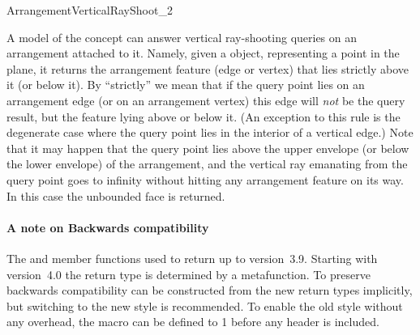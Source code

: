 
\ccRefPageBegin

\begin{ccRefConcept}{ArrangementVerticalRayShoot_2}

\ccDefinition

A model of the \ccRefName{} concept can answer vertical ray-shooting
queries on an arrangement attached to it. Namely, given a
 object, representing a point in the plane,
it returns the arrangement feature (edge or vertex) that lies
strictly above it (or below it). By ``strictly'' we mean that if the
query point lies on an arrangement edge (or on an arrangement vertex)
this edge will \emph{not} be the query result, but the feature lying
above or below it. (An exception to this rule is the degenerate case
where the query point lies in the interior of a vertical edge.) Note
that it may happen that the query point lies above the upper envelope
(or below the lower envelope) of the arrangement, and the vertical ray
emanating from the query point goes to infinity without hitting any
arrangement feature on its way. In this case the unbounded face is
returned.

\paragraph{A note on Backwards compatibility}
The  and  member functions used
to return  up to \cgal{} version~3.9. Starting with
\cal{} version~4.0 the return type is determined by a metafunction. To
preserve backwards compatibility  can be constructed
from the new return types implicitly, but switching to the new style
is recommended. To enable the old style without any overhead, the macro
 can be defined to 1 before any
\cgal{} header is included.

\ccTypes




\end{ccRefConcept}
